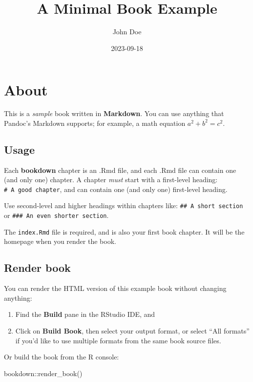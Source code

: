 \documentclass[
]{book}
\title{A Minimal Book Example}
\author{John Doe}
\date{2023-09-18}
\newenvironment{Shaded}{\begin{snugshade}}{\end{snugshade}}
\newcommand{\FunctionTok}[1]{\textcolor[rgb]{0.00,0.00,0.00}{#1}}
\newcommand{\NormalTok}[1]{#1}
\newcommand{\SpecialCharTok}[1]{\textcolor[rgb]{0.00,0.00,0.00}{#1}}
\begin{document}
\maketitle

{
\setcounter{tocdepth}{1}
\tableofcontents
}
\hypertarget{about}{%
\chapter{About}\label{about}}

This is a \emph{sample} book written in \textbf{Markdown}. You can use anything that Pandoc's Markdown supports; for example, a math equation \(a^2 + b^2 = c^2\).

\hypertarget{usage}{%
\section{Usage}\label{usage}}

Each \textbf{bookdown} chapter is an .Rmd file, and each .Rmd file can contain one (and only one) chapter. A chapter \emph{must} start with a first-level heading: \texttt{\#\ A\ good\ chapter}, and can contain one (and only one) first-level heading.

Use second-level and higher headings within chapters like: \texttt{\#\#\ A\ short\ section} or \texttt{\#\#\#\ An\ even\ shorter\ section}.

The \texttt{index.Rmd} file is required, and is also your first book chapter. It will be the homepage when you render the book.

\hypertarget{render-book}{%
\section{Render book}\label{render-book}}

You can render the HTML version of this example book without changing anything:

\begin{enumerate}
\def\labelenumi{\arabic{enumi}.}
\item
  Find the \textbf{Build} pane in the RStudio IDE, and
\item
  Click on \textbf{Build Book}, then select your output format, or select ``All formats'' if you'd like to use multiple formats from the same book source files.
\end{enumerate}

Or build the book from the R console:

\begin{Shaded}
\begin{Highlighting}[]
\NormalTok{bookdown}\SpecialCharTok{::}\FunctionTok{render\_book}\NormalTok{()}
\end{Highlighting}
\end{Shaded}
\end{document}
